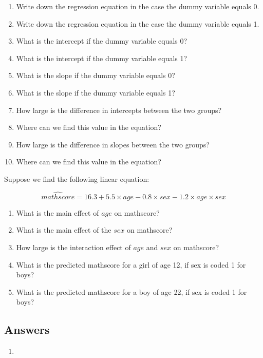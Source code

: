 \documentclass[]{report}\usepackage[]{graphicx}\usepackage[]{color}
\begin{document}
\begin{enumerate}


\item 
Write down the regression equation in the case the dummy variable equals 0.
\item Write down the regression equation in the case the dummy variable equals 1.
\item What is the intercept if the dummy variable equals 0?
\item What is the intercept if the dummy variable equals 1?
\item What is the slope if the dummy variable equals 0?
\item What is the slope if the dummy variable equals 1?
\item How large is the difference in intercepts between the two groups? 
\item Where can we find this value in the equation?
\item How large is the difference in slopes between the two groups?\
\item Where can we find this value in the equation?
\end{enumerate}
Suppose we find the following linear equation:

\begin{equation} 
\widehat{mathscore} = 16.3 + 5.5  \times age - 0.8  \times sex - 1.2  \times age  \times sex  \nonumber
\end{equation}
\begin{enumerate}

\item 
What is the main effect of $age$ on mathscore? 
\item What is the main effect of the $sex$ on mathscore?
\item How large is the interaction effect of $age$ and $sex$ on mathscore?
\item What is the predicted mathscore for a girl of age 12, if sex is coded 1 for boys?
\item What is the predicted mathscore for a boy of age 22, if sex is coded 1 for boys?

\end{enumerate}

\subsection{Answers}
\begin{enumerate}
\item 
\end{enumerate}
\end{document}
